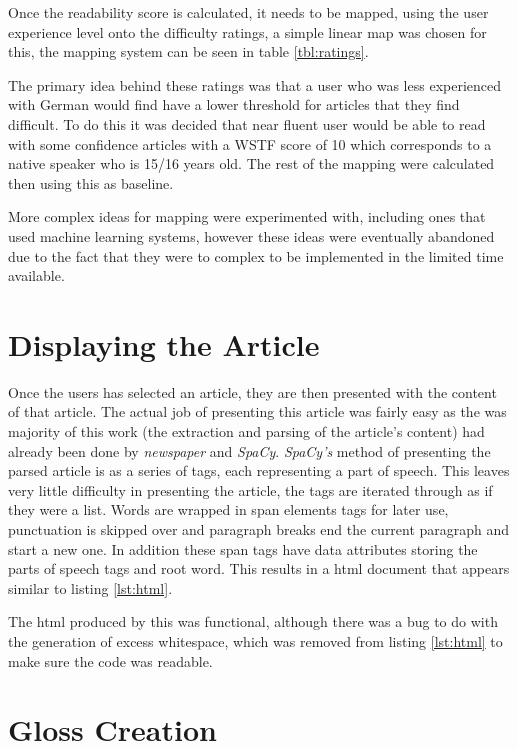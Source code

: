 Once the readability score is calculated, it needs to be mapped, using the user experience level onto the difficulty ratings, a simple linear map was chosen for this, the mapping system can be seen in table \ref{tbl:ratings}.



The primary idea behind these ratings was that a user who was less experienced with German would find have a lower threshold for articles that they find difficult. To do this it was decided that near fluent user would be able to read with some confidence articles with a WSTF score of 10 which corresponds to a native speaker who is 15/16 years old. The rest of the mapping were calculated then using this as baseline. 

More complex ideas for mapping were experimented with, including ones that used machine learning systems, however these ideas were eventually abandoned due to the fact that they were to complex to be implemented in the limited time available. 

\section{Displaying the Article}

Once the users has selected an article, they are then presented with the content of that article. The actual job of presenting this article was fairly easy as the was majority of this work (the extraction and parsing of the article's content) had already been done by \textit{newspaper} and \textit{SpaCy}.  \textit{SpaCy's} method of presenting the parsed article is as a series of tags, each representing a part of speech. This leaves very little difficulty in presenting the article, the tags are iterated through as if they were a list. Words are wrapped in span elements tags for later use, punctuation is skipped over and paragraph breaks end the current paragraph and start a new one. In addition these span tags have data attributes storing the parts of speech tags and root word. This results in a html document that appears similar to listing \ref{lst:html}.



The html produced by this was functional, although there was a bug to do with the generation of excess whitespace, which was removed from listing \ref{lst:html} to make sure the code was readable. 

\section{Gloss Creation}

